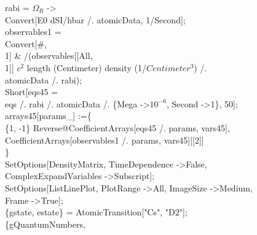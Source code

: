 rabi = $\Omega_R$ -\textgreater \\
   Convert[E0 dSI/hbar /. atomicData, 1/Second];\\
observables1 = \\
  Convert[\#, \\
     1] \& /\@ (observables[[All, \\
        1]] $c^2$ length (Centimeter) density (1/$Centimeter^3$) /. \\
      atomicData /. rabi);\\
Short[eqs45 = \\
   eqs /. rabi /. atomicData /. \{Mega -\textgreater $10^{-6}$, Second -\textgreater 1\}, 50];\\
arrays45[params\_] :=\{\\
  \{1, -1\} Reverse@CoefficientArrays[eqs45 /. params, vars45], \\
  CoefficientArrays[observables1 /. params, vars45][[2]]\\
  \} \\
SetOptions[DensityMatrix, TimeDependence -\textgreater False, \\
  ComplexExpandVariables -\textgreater Subscript];\\
SetOptions[ListLinePlot, PlotRange -\textgreater All, ImageSize -\textgreater Medium, \\
  Frame -\textgreater True];\\
\{gstate, estate\} = AtomicTransition["Cs", "D2"];\\
\{gQuantumNumbers, \\
